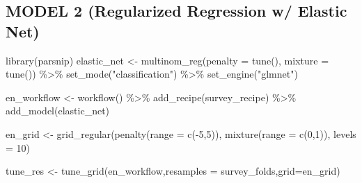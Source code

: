 \documentclass[
]{article}
\newenvironment{Shaded}{\begin{snugshade}}{\end{snugshade}}
\newcommand{\AttributeTok}[1]{\textcolor[rgb]{0.77,0.63,0.00}{#1}}
\newcommand{\DecValTok}[1]{\textcolor[rgb]{0.00,0.00,0.81}{#1}}
\newcommand{\FunctionTok}[1]{\textcolor[rgb]{0.00,0.00,0.00}{#1}}
\newcommand{\NormalTok}[1]{#1}
\newcommand{\OtherTok}[1]{\textcolor[rgb]{0.56,0.35,0.01}{#1}}
\newcommand{\SpecialCharTok}[1]{\textcolor[rgb]{0.00,0.00,0.00}{#1}}
\newcommand{\StringTok}[1]{\textcolor[rgb]{0.31,0.60,0.02}{#1}}
\begin{document}
\hypertarget{model-2-regularized-regression-w-elastic-net}{%
\subsection{MODEL 2 (Regularized Regression w/ Elastic
Net)}\label{model-2-regularized-regression-w-elastic-net}}

\begin{Shaded}
\begin{Highlighting}[]
\FunctionTok{library}\NormalTok{(parsnip)}
\NormalTok{elastic\_net }\OtherTok{\textless{}{-}} \FunctionTok{multinom\_reg}\NormalTok{(}\AttributeTok{penalty =} \FunctionTok{tune}\NormalTok{(),}
                                 \AttributeTok{mixture =} \FunctionTok{tune}\NormalTok{()) }\SpecialCharTok{\%\textgreater{}\%}
  \FunctionTok{set\_mode}\NormalTok{(}\StringTok{"classification"}\NormalTok{) }\SpecialCharTok{\%\textgreater{}\%}
  \FunctionTok{set\_engine}\NormalTok{(}\StringTok{"glmnet"}\NormalTok{)}

\NormalTok{en\_workflow }\OtherTok{\textless{}{-}} \FunctionTok{workflow}\NormalTok{() }\SpecialCharTok{\%\textgreater{}\%}
  \FunctionTok{add\_recipe}\NormalTok{(survey\_recipe) }\SpecialCharTok{\%\textgreater{}\%}
  \FunctionTok{add\_model}\NormalTok{(elastic\_net)}

\NormalTok{en\_grid }\OtherTok{\textless{}{-}} \FunctionTok{grid\_regular}\NormalTok{(}\FunctionTok{penalty}\NormalTok{(}\AttributeTok{range =} \FunctionTok{c}\NormalTok{(}\SpecialCharTok{{-}}\DecValTok{5}\NormalTok{,}\DecValTok{5}\NormalTok{)),}
                        \FunctionTok{mixture}\NormalTok{(}\AttributeTok{range =} \FunctionTok{c}\NormalTok{(}\DecValTok{0}\NormalTok{,}\DecValTok{1}\NormalTok{)), }\AttributeTok{levels =} \DecValTok{10}\NormalTok{)}

\NormalTok{tune\_res }\OtherTok{\textless{}{-}} \FunctionTok{tune\_grid}\NormalTok{(en\_workflow,}\AttributeTok{resamples =}\NormalTok{ survey\_folds,}\AttributeTok{grid=}\NormalTok{en\_grid)}
\end{Highlighting}
\end{Shaded}
\end{document}
